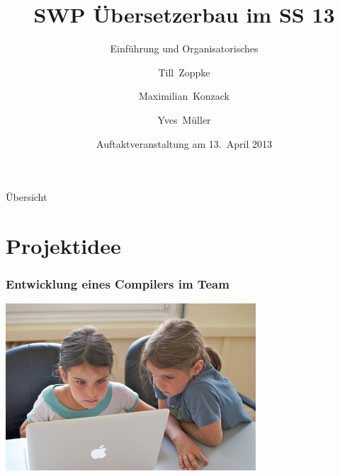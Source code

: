 \documentclass[ucs,9pt]{beamer}
\title{SWP Übersetzerbau im SS 13}
\subtitle{Einführung und Organisatorisches}
\author{Till~Zoppke \and Maximilian~Konzack \and Yves~Müller}
\institute[FU Berlin]{Freie Universität Berlin}
\date{Auftaktveranstaltung am 13.~April 2013}
\begin{document}
\begin{frame}[plain]
  \titlepage
\end{frame}

\begin{frame}{Übersicht}
  \tableofcontents
\end{frame}

\section{Projektidee}
\begin{frame}
  \frametitle{Entwicklung eines Compilers im Team}
  \begin{center}
    \includegraphics[width=0.7\textwidth]{pair_prog}
  \end{center}
\end{frame}
\end{document}
